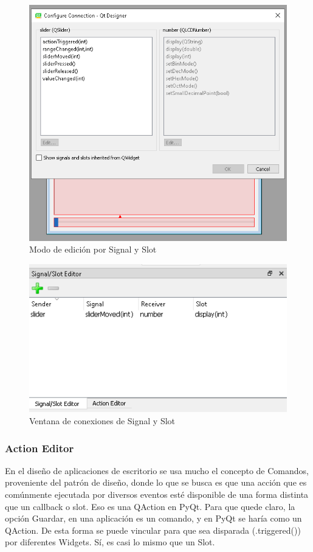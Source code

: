 \begin{figure}[H]
    \centering
    \includegraphics[scale=0.6]{imagenes/qtdesigner/qt_signal_slot_mode.PNG}
    \caption{Modo de edici\'on por Signal y Slot}
    \label{fig:qt_signal_slot_0}
\end{figure}

\begin{figure}[H]
    \centering
    \includegraphics[scale=0.6]{imagenes/qtdesigner/qt_slot_singla.PNG}
    \caption{Ventana de conexiones de Signal y Slot}
    \label{fig:qt_signal_slot_1}
\end{figure}

\subsubsection{Action Editor}
En el dise\~no de aplicaciones de escritorio se usa mucho el concepto de Comandos, proveniente del patr\'on de dise\~no, donde lo que se busca es que una acci\'on
que es com\'unmente ejecutada por diversos eventos est\'e disponible de una forma distinta que un callback o slot. Eso es una QAction en PyQt.
Para que quede claro, la opci\'on Guardar, en una aplicaci\'on es un comando, y en PyQt se har\'ia como un QAction. De esta forma se puede vincular
para que sea disparada (.triggered()) por diferentes Widgets. S\'i, es casi lo mismo que un Slot.


